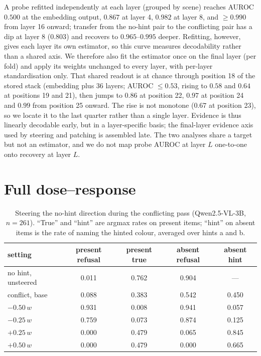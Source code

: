 \documentclass[10pt]{article}
\newcommand{\wdir}{w}
\begin{document}
A probe refitted independently at each layer (grouped by scene) reaches AUROC $0.500$ at the embedding output, $0.867$ at layer 4, $0.982$ at layer 8, and $\ge0.990$ from layer 16 onward; transfer from the no-hint pair to the conflicting pair has a dip at layer 8 ($0.803$) and recovers to $0.965$--$0.995$ deeper. Refitting, however, gives each layer its own estimator, so this curve measures decodability rather than a shared axis. We therefore also fit the estimator once on the final layer (per fold) and apply its weights unchanged to every layer, with per-layer standardisation only. That shared readout is at chance through position 18 of the stored stack (embedding plus 36 layers; AUROC $\le0.53$, rising to $0.58$ and $0.64$ at positions 19 and 21), then jumps to $0.86$ at position 22, $0.97$ at position 24 and $0.99$ from position 25 onward. The rise is not monotone ($0.67$ at position 23), so we locate it to the last quarter rather than a single layer. Evidence is thus linearly decodable early, but in a layer-specific basis; the final-layer evidence axis used by steering and patching is assembled late. The two analyses share a target but not an estimator, and we do not map probe AUROC at layer $L$ one-to-one onto recovery at layer $L$.

\section{Full dose--response}
\label{app:dose}

\begin{table}[h]
\centering
\small
\caption{Steering the no-hint direction during the conflicting pass (Qwen2.5-VL-3B, $n=261$). ``True'' and ``hint'' are argmax rates on present items; ``hint'' on absent items is the rate of naming the hinted colour, averaged over hints a and b.}
\begin{tabular}{lcccc}
\toprule
setting & present refusal & present true & absent refusal & absent hint \\
\midrule
no hint, unsteered & 0.011 & 0.762 & 0.904 & --- \\
conflict, base & 0.088 & 0.383 & 0.542 & 0.450 \\
$-0.50\,\wdir$ & 0.931 & 0.008 & 0.941 & 0.057 \\
$-0.25\,\wdir$ & 0.759 & 0.073 & 0.874 & 0.125 \\
$+0.25\,\wdir$ & 0.000 & 0.479 & 0.065 & 0.845 \\
$+0.50\,\wdir$ & 0.000 & 0.479 & 0.000 & 0.665 \\
\bottomrule
\end{tabular}
\end{table}
\end{document}

